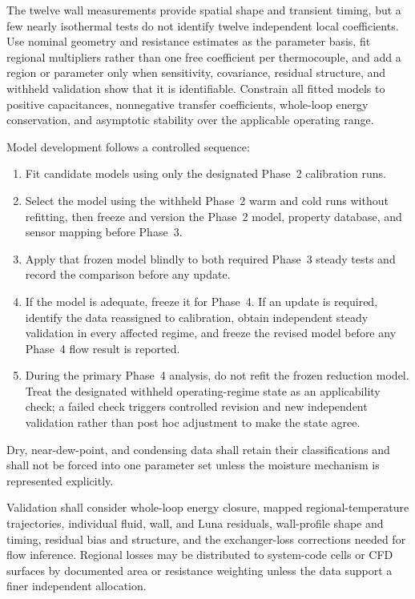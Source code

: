 \documentclass[11pt]{article}
\begin{document}
The twelve wall measurements provide spatial shape and transient timing, but a few nearly isothermal tests do not identify twelve independent local coefficients. Use nominal geometry and resistance estimates as the parameter basis, fit regional multipliers rather than one free coefficient per thermocouple, and add a region or parameter only when sensitivity, covariance, residual structure, and withheld validation show that it is identifiable. Constrain all fitted models to positive capacitances, nonnegative transfer coefficients, whole-loop energy conservation, and asymptotic stability over the applicable operating range.

Model development follows a controlled sequence:
\begin{enumerate}
    \item Fit candidate models using only the designated Phase~2 calibration runs.
    \item Select the model using the withheld Phase~2 warm and cold runs without refitting, then freeze and version the Phase~2 model, property database, and sensor mapping before Phase~3.
    \item Apply that frozen model blindly to both required Phase~3 steady tests and record the comparison before any update.
    \item If the model is adequate, freeze it for Phase~4. If an update is required, identify the data reassigned to calibration, obtain independent steady validation in every affected regime, and freeze the revised model before any Phase~4 flow result is reported.
    \item During the primary Phase~4 analysis, do not refit the frozen reduction model. Treat the designated withheld operating-regime state as an applicability check; a failed check triggers controlled revision and new independent validation rather than post hoc adjustment to make the state agree.
\end{enumerate}
Dry, near-dew-point, and condensing data shall retain their classifications and shall not be forced into one parameter set unless the moisture mechanism is represented explicitly.

Validation shall consider whole-loop energy closure, mapped regional-temperature trajectories, individual fluid, wall, and Luna residuals, wall-profile shape and timing, residual bias and structure, and the exchanger-loss corrections needed for flow inference. Regional losses may be distributed to system-code cells or CFD surfaces by documented area or resistance weighting unless the data support a finer independent allocation.
\end{document}
